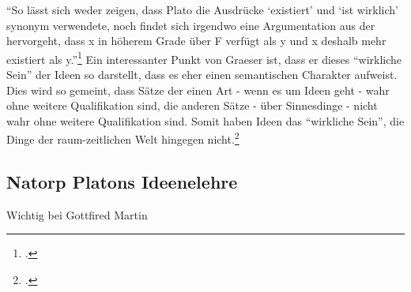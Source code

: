 \documentclass[12pt]{article}
\begin{document}
\enquote{So lässt sich weder zeigen, dass Plato die Ausdrücke \enquote{existiert} und \enquote{ist wirklich} synonym verwendete, noch findet sich irgendwo eine Argumentation aus der hervorgeht, dass x in höherem Grade über F verfügt als y und x deshalb mehr existiert als y.}\footcite[][S. 140]{GraeserPhiloGeschichte}
Ein interessanter Punkt von Graeser ist, dass er dieses \enquote{wirkliche Sein} der Ideen so darstellt, dass es eher einen semantischen Charakter aufweist. Dies wird so gemeint, dass Sätze der einen Art - wenn es um Ideen geht - wahr ohne weitere Qualifikation sind, die anderen Sätze - über Sinnesdinge - nicht wahr ohne weitere Qualifikation sind. Somit haben Ideen das \enquote{wirkliche Sein}, die Dinge der raum-zeitlichen Welt hingegen nicht.\footcite[vgl.][S. 141]{GraeserPhiloGeschichte}
\subsection*{Natorp Platons Ideenelehre}
Wichtig bei Gottfired Martin\nocite{NatorpIdeenlehre}
\end{document}
